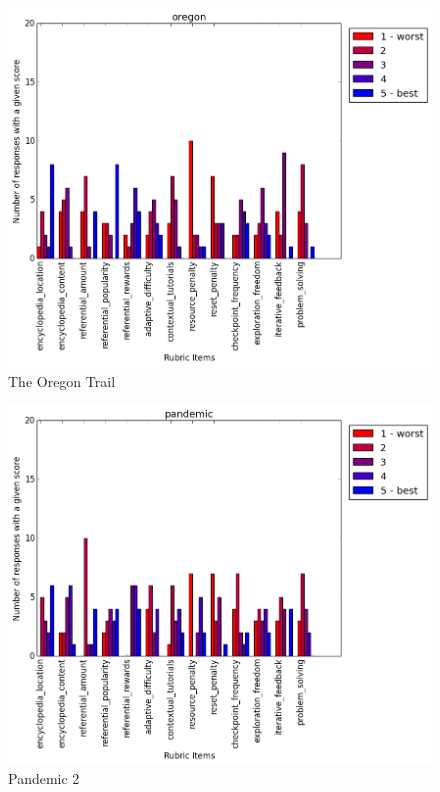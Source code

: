 			\begin{figure}[] 
			\centering 
			\includegraphics[width=\textwidth]{oregon_scores.png} 
			\caption{The Oregon Trail}
			\end{figure}

			\begin{figure}[] 
			\centering 
			\includegraphics[width=\textwidth]{pandemic_scores.png} 
			\caption{Pandemic 2}
			\end{figure}

